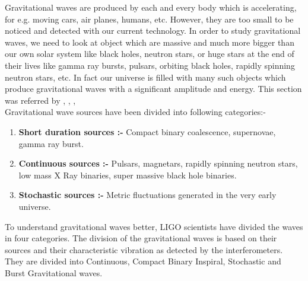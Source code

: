 \hspace{0.6 cm} Gravitational waves are produced by each and every body which is accelerating, for e.g. moving cars, air planes, humans, etc. However, they are too small to be noticed and detected with our current technology. In order to study gravitational waves, we need to look at object which are massive and much more bigger than our own solar system like black holes, neutron stars, or huge stars at the end of their lives like gamma ray bursts, pulsars, orbiting black holes, rapidly spinning neutron stars, etc. In fact our universe is filled with many such objects which produce gravitational waves with a significant amplitude and energy. This section was referred by \cite{Linear}, \cite{Allen1996TheSG}, \cite{Neutron_wiki} , \cite{sounds_of_space} \\

\noindent Gravitational wave sources have been divided into following categories:-

\begin{enumerate}
    \item \textbf{Short duration sources :-} Compact binary coalescence, supernovae, gamma ray burst.

    \item \textbf{Continuous sources :-} Pulsars, magnetars, rapidly spinning neutron stars, low mass X Ray binaries, super massive black hole binaries.

    \item \textbf{Stochastic sources :-} Metric fluctuations generated in the very early universe.
\end{enumerate}

\noindent To understand gravitational waves better, LIGO scientists have divided the waves in four categories. The division of the gravitational waves is based on their sources and their characteristic vibration as detected by the interferometers.  They are divided into Continuous, Compact Binary Inspiral, Stochastic and Burst Gravitational waves.


